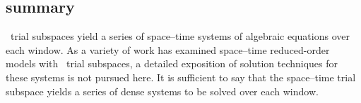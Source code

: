 \subsection{\spaceTimeAcronym\: summary}
\spaceTimeAcronym\ trial subspaces yield a series of space--time systems of algebraic equations over each window. As a variety of work has examined space--time reduced-order models with \spaceTimeAcronym\ trial subspaces, 
a detailed exposition of solution techniques for these systems is not pursued here. It is sufficient to say that the 
space--time trial subspace yields a series of dense systems to be solved over each window.
